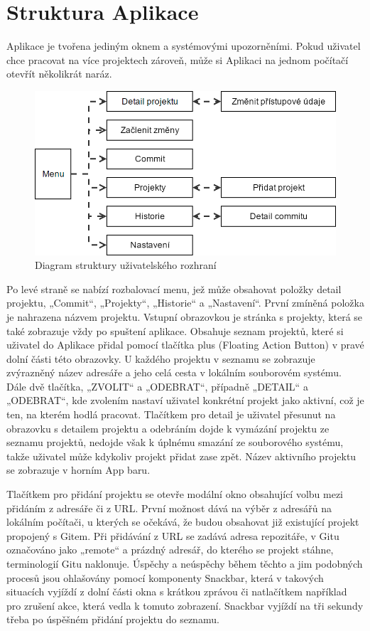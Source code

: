\section{Struktura Aplikace}

Aplikace je tvořena jediným oknem a systémovými upozorněními. Pokud uživatel chce pracovat na více projektech zároveň, může si Aplikaci na jednom počítačí otevřít několikrát naráz.


\begin{figure}[ht]
	\centering
	\includegraphics[width=\textwidth]{sections/ui/images/flow.png}
	\caption{Diagram struktury uživatelského rozhraní}
\end{figure}

Po levé straně se nabízí rozbalovací menu, jež může obsahovat položky detail projektu, „Commit“, „Projekty“, „Historie“ a „Nastavení“. První zmíněná položka je nahrazena názvem projektu. Vstupní obrazovkou je stránka s projekty, která se také zobrazuje vždy po spuštení aplikace. Obsahuje seznam projektů, které si uživatel do Aplikace přidal pomocí tlačítka plus (Floating Action Button) v pravé dolní části této obrazovky. U každého projektu v seznamu se zobrazuje zvýrazněný název adresáře a jeho celá cesta v lokálním souborovém systému. Dále dvě tlačítka, „ZVOLIT“ a „ODEBRAT“, případně „DETAIL“ a „ODEBRAT“, kde zvolením nastaví uživatel konkrétní projekt jako aktivní, což je ten, na kterém hodlá pracovat. Tlačítkem pro detail je uživatel přesunut na obrazovku s detailem projektu a odebráním dojde k vymázání projektu ze seznamu projektů, nedojde však k úplnému smazání ze souborového systému, takže uživatel může kdykoliv projekt přidat zase zpět. Název aktivního projektu se zobrazuje v horním App baru.

Tlačítkem pro přidání projektu se otevře modální okno obsahující volbu mezi přidáním z adresáře či z URL. První možnost dává na výběr z adresářů na lokálním počítači, u kterých se očekává, že budou obsahovat již existující projekt propojený s Gitem. Při přidávání z URL se zadává adresa repozitáře, v Gitu označováno jako „remote“ a prázdný adresář, do kterého se projekt stáhne, terminologií Gitu naklonuje. Úspěchy a neúspěchy během těchto a jim podobných procesů jsou ohlašovány pomocí komponenty Snackbar, která v takových situacích vyjíždí z dolní části okna s krátkou zprávou či natlačítkem například pro zrušení akce, která vedla k tomuto zobrazení. Snackbar vyjíždí na tři sekundy třeba po úspěšném přidání projektu do seznamu.

